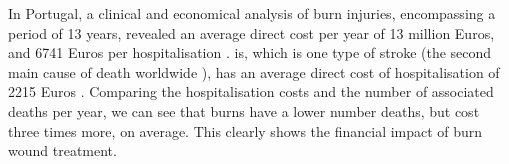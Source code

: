 In Portugal, a clinical and economical analysis of burn injuries, encompassing a period of 13 years, revealed an average direct cost per year of 13 million Euros, and 6741 Euros per hospitalisation \cite{Santos_2016_burden_burns_portugal}. \gls{is}, which is one type of stroke (the second main cause of death worldwide \cite{GHE2016_xls}), has an average direct cost of hospitalisation of 2215 Euros \cite{Santos_2017_atrial_fibrillation_stroke}. Comparing the hospitalisation costs and the number of associated deaths per year, we can see that burns have a lower number deaths, but cost three times more, on average. This clearly shows the financial impact of burn wound treatment. \bigskip

\begin{comment}
According to the \citeauthor{who2008_plan_burn_prevention_care} (WHO) \cite{who2011_sucess_stories}, the occurrence and outcome severity of burn injuries are higher on \gls{lmic} than on \gls{hic}, with 95\% of annual casualties happening on \gls{lmic}. The death rate in \gls{lmic} is about 6 times larger than on \gls{hic}, reaching around 5.5 deaths/100 000 people per year \cite{who2011_sucess_stories}. 

The disparity on resources between \gls{hic} and \gls{lmic} means the former has a better leverage to develop strategies to reduce the onset of burn events and lower its morbidity and mortality. Valid strategies consist of: (a) the implementation of effective prevention plans, (b) providing better first-aid and medical care, (c) the application of follow-up intervention for rehabilitation and psychological support, or (d) the development of research efforts to better understand the reality of burn injuries. \cite{who2008_plan_burn_prevention_care, who2011_sucess_stories}. The implementation of these strategies on high income countries have "effectively and sustainably" reduced the number of events and mortality over the last three to four decades \cite{who2011_sucess_stories}. 
Now, the focus of \gls{hic} is on better medical care to improve healing and reduce scarring, or to provide rehabilitation and psychological support. Restoring "form and function have become the hallmarks of excellent burn care" \cite{isbi_guidelines_burn_care}. On \gls{lmic}, the main focus should be on reducing the occurrence, morbidity and mortality. This means they need to place more effort on prevention, first-aid care and hospital care \cite{who2008_plan_burn_prevention_care, who2011_sucess_stories}.

The occurrence by cause of burn varies between \gls{hic} and \gls{lmic}. In \gls{hic} the most common cause are scalds associated with food preparation or consumption and bathing. The victims of these scalds tend to be infants younger than 5 years old. In \gls{lmic} flame burns are the most common. They are usually related with the usage of unsafe stoves and lamps. Scalds, generally, lead to non-lethal burns, however, on younger ages, in many cases it leads to death. Burns by flame are more lethal, usually having higher \gls{tbsa} and depth \cite{who2011_sucess_stories, who_unicef2008_burns_chapter}.\\
\end{comment}

